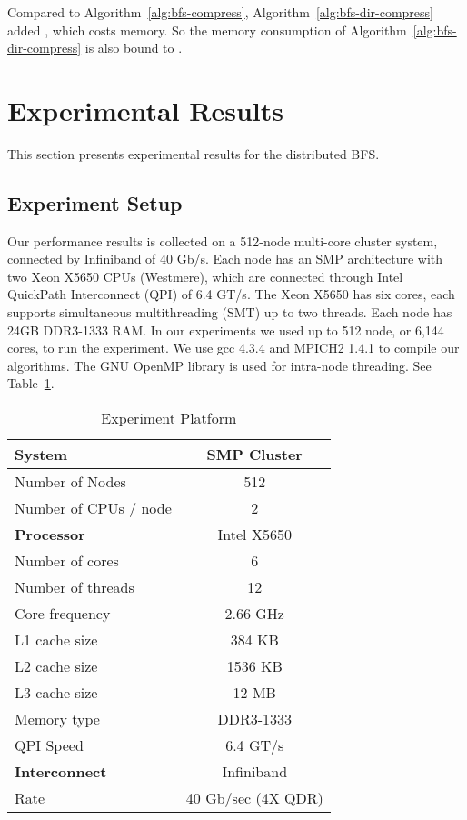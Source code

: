 \documentclass[conference]{IEEEtran}
\begin{document}
Compared to Algorithm~\ref{alg:bfs-compress},
Algorithm~\ref{alg:bfs-dir-compress} added , which costs  memory.
So the memory consumption of Algorithm~\ref{alg:bfs-dir-compress} is also
bound to .



\section{Experimental Results}
\label{sec:exp}

This section presents experimental results for the distributed BFS. 

\subsection{Experiment Setup}

Our performance results is collected on a 512-node multi-core cluster system,
connected by Infiniband of 40 Gb/s. Each node has an SMP architecture with two
Xeon X5650 CPUs (Westmere), which are connected through Intel QuickPath
Interconnect (QPI) of 6.4 GT/s. The Xeon X5650 has six cores, each supports
simultaneous multithreading (SMT) up to two threads. Each node has 24GB
DDR3-1333 RAM. In our experiments we used up to 512 node, or 6,144 cores, to
run the experiment. We use gcc 4.3.4 and MPICH2 1.4.1 to compile our
algorithms. The GNU OpenMP library is used for intra-node threading. See
Table~\ref{table:platform}.

\begin{table}[t]
  \caption{Experiment Platform}
  \label{table:platform}
  \begin{center}
    \begin{tabular}{lc}
      \toprule \textbf{System} &  SMP Cluster\\\midrule
      Number of Nodes & 512 \\
      Number of CPUs / node & 2 \\\bottomrule
      \textbf{Processor} & Intel X5650 \\\midrule
      Number of cores & 6 \\
      Number of threads & 12 \\
      Core frequency & 2.66 GHz \\
      L1 cache size &  384 KB \\
      L2 cache size & 1536 KB \\
      L3 cache size & 12 MB \\
      Memory type & DDR3-1333 \\
      QPI Speed & 6.4 GT/s \\\bottomrule
      \textbf{Interconnect} & Infiniband \\\midrule
      Rate & 40 Gb/sec (4X QDR) \\\bottomrule
    \end{tabular}
  \end{center}
\end{table}
\end{document}
